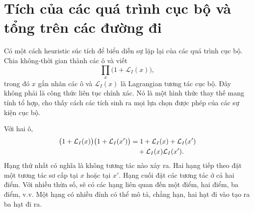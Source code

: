 \begin{classroomqa}
\end{classroomqa}

\section{Tích của các quá trình cục bộ và tổng trên các đường đi}

Có một cách heuristic súc tích để biểu diễn sự lặp lại của các quá trình cục bộ. Chia không-thời gian thành các ô và viết
\begin{equation}
\prod_x\bigl(1+\mathcal L_I(x)\bigr),
\end{equation}
trong đó \(x\) gắn nhãn các ô và \(\mathcal L_I(x)\) là Lagrangian tương tác cục bộ. Đây không phải là công thức liên tục chính xác. Nó là một hình thức thay thế mang tính tổ hợp, cho thấy cách các tích sinh ra mọi lựa chọn được phép của các sự kiện cục bộ.

\begin{classroomqa}
\end{classroomqa}

Với hai ô,
\begin{align}
\bigl(1+\mathcal L_I(x)\bigr)
\bigl(1+\mathcal L_I(x')\bigr)
&=
1+\mathcal L_I(x)+\mathcal L_I(x')
\notag\\
&\quad{}+\mathcal L_I(x)\mathcal L_I(x').
\end{align}
Hạng thứ nhất có nghĩa là không tương tác nào xảy ra. Hai hạng tiếp theo đặt một tương tác sơ cấp tại \(x\) hoặc tại \(x'\). Hạng cuối đặt các tương tác ở cả hai điểm. Với nhiều thừa số, sẽ có các hạng liên quan đến một điểm, hai điểm, ba điểm, v.v. Một hạng có nhiều đỉnh có thể mô tả, chẳng hạn, hai hạt đi vào tạo ra ba hạt đi ra.

